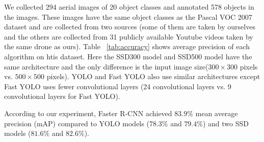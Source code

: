We collected 294 aerial images of 20 object classes and annotated 578 objects in the images. 
These images have the same object classes as the Pascal VOC 2007 dataset and are collected from two sources (some of them are taken by ourselves and the others are collected from 31 publicly available Youtube videos taken by the same drone as ours).
Table ~\ref{tab:accuracy} shows average precision of each algorithm on htis dataset. Here the SSD300 model and SSD500 model have the same architecture and the only difference is the input image size($300 \times 300$ pixels vs. $500 \times 500$ pixels). YOLO and Fast YOLO also use similar architectures except Fast YOLO uses fewer convolutional layers (24 convolutional layers vs. 9 convolutional layers for Fast YOLO).

According to our experiment, Faster R-CNN achieved $83.9\%$ mean average precision (mAP) compared to YOLO models ($78.3\%$ and $79.4\%$) and two SSD models ($81.6\%$ and $82.6\%$).

